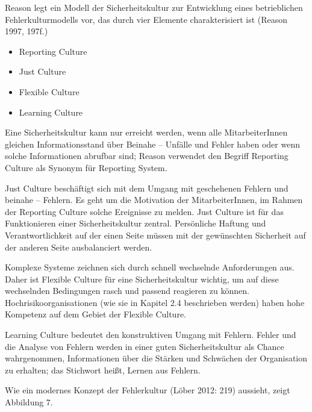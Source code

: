 Reason legt ein Modell der Sicherheitskultur zur Entwicklung
eines betrieblichen Fehlerkulturmodells vor, das durch vier
Elemente charakterisiert ist (Reason 1997, 197f.)

\begin{itemize}
  \item Reporting Culture
  \item Just Culture
  \item Flexible Culture
  \item Learning Culture
\end{itemize}
Eine Sicherheitskultur kann nur erreicht werden, wenn alle
MitarbeiterInnen gleichen Informationsstand über Beinahe –
Unfälle und Fehler haben oder wenn solche Informationen
abrufbar sind; Reason verwendet den Begriff Reporting
Culture als Synonym für Reporting System.




Just Culture beschäftigt sich mit dem Umgang mit geschehenen
Fehlern und beinahe – Fehlern. Es geht um die Motivation
der MitarbeiterInnen, im Rahmen der Reporting Culture
solche Ereignisse zu melden. Just Culture ist für das
Funktionieren einer Sicherheitskultur zentral. Persönliche
Haftung und Verantwortlichkeit auf der einen Seite müssen
mit der gewünschten Sicherheit auf der anderen Seite
ausbalanciert werden.




Komplexe Systeme zeichnen sich durch schnell wechselnde
Anforderungen aus. Daher ist Flexible Culture für eine
Sicherheitskultur wichtig, um auf diese wechselnden
Bedingungen rasch und passend reagieren zu können.
Hochrisikoorganisationen (wie sie in Kapitel 2.4
beschrieben werden) haben hohe Kompetenz auf dem Gebiet der
Flexible Culture.




Learning Culture bedeutet den konstruktiven Umgang mit
Fehlern. Fehler und die Analyse von Fehlern werden in einer
guten Sicherheitskultur als Chance wahrgenommen,
Informationen über die Stärken und Schwächen der
Organisation zu erhalten; das Stichwort heißt, Lernen aus
Fehlern.




Wie ein modernes Konzept der Fehlerkultur (Löber 2012: 219)
aussieht, zeigt Abbildung 7.









